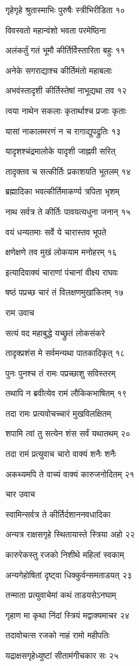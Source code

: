 गृहेगृहे श्रुतास्माभिः पुरुषैः स्त्रीभिरीडिता १०

विवस्वतो महान्वंशो भवता परमेष्ठिना

अलंकर्तुं गतं भूमौ कीर्तिर्विस्तारिता बहुः ११

अनेके सगराद्याश्च कीर्तिमंतो महाबलाः

अभवंस्तादृशी कीर्तिस्तेषां नाभूद्यथा तव १२

त्वया नाथेन सकलाः कृतार्थाश्च प्रजाः कृताः

यासां नाकालमरणं न च रागाद्युपद्रुतिः १३

यादृशश्चंद्रमालोके यादृशी जाह्नवी सरित्

तादृक्तव च सत्कीर्तिः प्रकाशयति भूतलम् १४

ब्रह्मादिका भवत्कीर्तिमाकर्ण्य त्रपिता भृशम्

नाथ सर्वत्र ते कीर्तिः पावयत्यधुना जनान् १५

वयं धन्यतमाः सर्वे ये चारास्तव भूपते

क्षणेक्षणे तव मुखं लोकयाम मनोहरम् १६

इत्यादिवाक्यं चाराणां पंचानां वीक्ष्य राघवः

षष्ठं पप्रच्छ चारं तं विलक्षणमुखांकितम् १७

राम उवाच

सत्यं वद महाबुद्धे यच्छ्रुतं लोकसंकरे

तादृक्प्रशंस मे सर्वमन्यथा पातकादिकृत् १८

पुनः पुनश्च तं रामः पप्रच्छाशु सविस्तरम्

तथापि न ब्रवीत्येव रामं लौकिकभाषितम् १९

तदा रामः प्रत्यवोचच्चारं मुखविलक्षितम्

शपामि त्वां तु सत्येन शंस सर्वं यथातथम् २०

तदा रामं प्रत्युवाच चारो वाक्यं शनैः शनैः

अकथ्यमपि ते वाच्यं वाक्यं कारुजनोदितम् २१

चार उवाच

स्वामिन्सर्वत्र ते कीर्तिर्दशाननवधादिका

अन्यत्र राक्षसगृहे स्थितायास्ते स्त्रिया अहो २२

कारुरेकस्तु रजको निशीथे महिलां स्वकाम्

अन्यगेहोषितां दृष्ट्वा धिक्कुर्वन्समताडयत् २३

तन्माता प्रत्युवाचेमां कथं ताडयसेऽनघाम्

गृहाण मा कृथा निंदां स्त्रियं मद्वाक्यमाचर २४

तदावोचत्स रजको नाहं रामो महीपतिः

यद्राक्षसगृहेध्युष्टां सीतामंगीचकार सः २५

